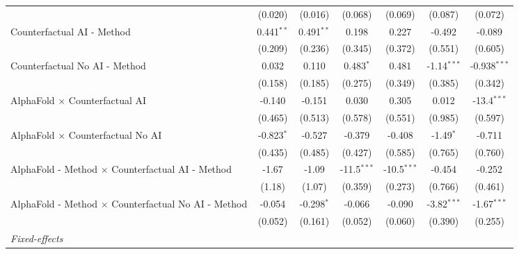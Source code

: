\begin{tabular}{lcccccc}
                                                              & (0.020)      & (0.016)      & (0.068)       & (0.069)       & (0.087)       & (0.072)\\   
   Counterfactual AI - Method                                 & 0.441$^{**}$ & 0.491$^{**}$ & 0.198         & 0.227         & -0.492        & -0.089\\   
                                                              & (0.209)      & (0.236)      & (0.345)       & (0.372)       & (0.551)       & (0.605)\\   
   Counterfactual No AI - Method                              & 0.032        & 0.110        & 0.483$^{*}$   & 0.481         & -1.14$^{***}$ & -0.938$^{***}$\\   
                                                              & (0.158)      & (0.185)      & (0.275)       & (0.349)       & (0.385)       & (0.342)\\   
   AlphaFold $\times$ Counterfactual AI                       & -0.140       & -0.151       & 0.030         & 0.305         & 0.012         & -13.4$^{***}$\\   
                                                              & (0.465)      & (0.513)      & (0.578)       & (0.551)       & (0.985)       & (0.597)\\   
   AlphaFold $\times$ Counterfactual No AI                    & -0.823$^{*}$ & -0.527       & -0.379        & -0.408        & -1.49$^{*}$   & -0.711\\   
                                                              & (0.435)      & (0.485)      & (0.427)       & (0.585)       & (0.765)       & (0.760)\\   
   AlphaFold - Method $\times$ Counterfactual AI - Method     & -1.67        & -1.09        & -11.5$^{***}$ & -10.5$^{***}$ & -0.454        & -0.252\\   
                                                              & (1.18)       & (1.07)       & (0.359)       & (0.273)       & (0.766)       & (0.461)\\   
   AlphaFold - Method $\times$ Counterfactual No AI - Method  & -0.054       & -0.298$^{*}$ & -0.066        & -0.090        & -3.82$^{***}$ & -1.67$^{***}$\\   
                                                              & (0.052)      & (0.161)      & (0.052)       & (0.060)       & (0.390)       & (0.255)\\   
   \midrule
   \emph{Fixed-effects}\\

\end{tabular}
